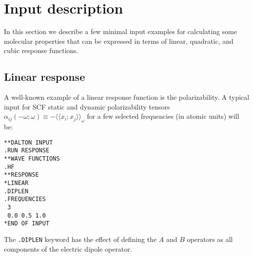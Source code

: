 \section{Input description}
\label{sec:rspex}
 
In this section we describe a few minimal input examples for calculating some
molecular properties that can be expressed in terms of linear, quadratic, and
cubic response functions.
 
\subsection{Linear response}
\label{subsec:linrsp}

\begin{center}
\end{center}

A well-known example of a linear response
function is the polarizability.
A typical input for SCF static and dynamic polarizability tensors
$\alpha_{ij}(-\omega;\omega)\equiv-\langle\!\langle
x_i;x_j\rangle\!\rangle_\omega$ for a few selected frequencies (in
atomic units) will be:
\begin{verbatim}
**DALTON INPUT
.RUN RESPONSE
**WAVE FUNCTIONS
.HF
**RESPONSE
*LINEAR
.DIPLEN
.FREQUENCIES
 3
 0.0 0.5 1.0
*END OF INPUT
\end{verbatim}
The {\tt .DIPLEN} keyword has the effect of defining the $A$ and $B$
operators as all components of the electric dipole operator.

